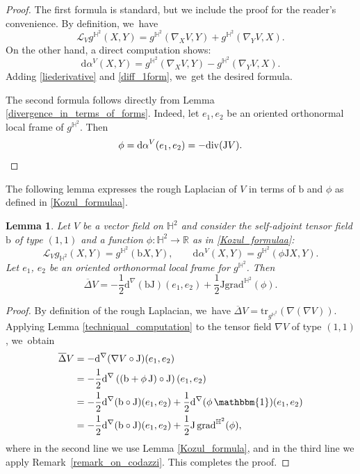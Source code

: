 \documentclass[JEP,XML,SOM,Unicode,NoEqCountersInSection, NoFloatCountersInSection,published]{cedram}
\theoremstyle{plain}
\newtheorem{lemma}[cor]{Lemma}
\theoremstyle{definition}
\newcommand{\grad}{\mathrm{grad}^{\mathbb{H}^2}}
\newcommand{\J}{\mathrm{J}}
\begin{document}
\begin{proof}
The first formula is standard, but we include the proof for the reader's convenience. By definition, we~have
\begin{equation}\label{liederivative}
\mathcal{L}_Vg^{\mathbb{H}^2}(X,Y)=g^{\mathbb{H}^2}(\nabla_XV,Y)+g^{\mathbb{H}^2}(\nabla_YV,X).
\end{equation}
On the other hand, a direct computation shows:
\begin{equation}\label{diff_1form}
\mathrm{d}\alpha^V(X,Y)=g^{\mathbb{H}^2}(\nabla_XV,Y)-g^{\mathbb{H}^2}(\nabla_YV,X).
\end{equation}
Adding \eqref{liederivative} and \eqref{diff_1form}, we~get the desired formula.

The second formula follows directly from Lemma \ref{divergence_in_terms_of_forms}. Indeed, let $e_1, e_2$ be an oriented orthonormal local frame of $g^{\mathbb{H}^2}$. Then
\[
\phi=\mathrm{d}\alpha^V(e_1,e_2)=-\mathrm{div}(\mathrm{J} V). \qedhere
\]
\end{proof}
The following lemma expresses the rough Laplacian of \(V \) in terms of \(\mathrm{b} \) and \(\phi \) as defined in \eqref{Kozul_formulaa}.
\begin{lemma}\label{prepa1_CH_HL}
Let $V$ be a vector field on $\mathbb{H}^2$ and consider the self-adjoint tensor field $\mathrm{b}$ of type $(1,1)$ and a function $\phi:\mathbb{H}^2\to \mathbb{R}$ as in \eqref{Kozul_formulaa}:
\[
\mathcal{L}_Vg_{\mathbb{H}^2}(X,Y)=g^{\mathbb{H}^2}(\mathrm{b} X,Y),\qquad \mathrm{d}\alpha^V(X,Y)=g^{\mathbb{H}^2}(\phi \J X,Y).
\]Let $e_1$, $e_2$ be an oriented orthonormal local frame for $g^{\mathbb{H}^2}$. Then
\[
\overline{\Delta}V=-\frac{1}{2}\mathrm{d}^{\nabla}(\mathrm{b}\J)(e_1,e_2)+\frac{1}{2}\J\grad(\phi).
\]
\end{lemma}

\begin{proof}
By definition of the rough Laplacian, we~have \(\overline{\Delta}V = \mathrm{tr}_{g^{\mathbb{H}^2}}(\nabla (\nabla V))\). Applying Lemma \ref{techniqual_computation} to the tensor field \(\nabla V\) of type $(1,1)$, we~obtain
\begin{align*}
\overline{\Delta} V &= -\mathrm{d}^{\nabla}(\nabla V \circ \mathrm{J})(e_1,e_2) \\
&= -\frac{1}{2} \mathrm{d}^{\nabla}\left((\mathrm{b} + \phi\, \mathrm{J}) \circ \mathrm{J}\right) (e_1,e_2)\\
&= -\frac{1}{2} \mathrm{d}^{\nabla}(\mathrm{b} \circ \mathrm{J})(e_1,e_2) + \frac{1}{2} \mathrm{d}^{\nabla}(\phi\, \mathbbm{1})(e_1,e_2) \\
&= -\frac{1}{2} \mathrm{d}^{\nabla}(\mathrm{b} \circ \mathrm{J})(e_1,e_2) + \frac{1}{2} \mathrm{J} \, \mathrm{grad}^{\mathbb{H}^2}(\phi),
\end{align*}
where in the second line we use Lemma \ref{Kozul_formula}, and in the third line we apply Remark~\ref{remark_on_codazzi}. This completes the proof.
\end{proof}
\end{document}
